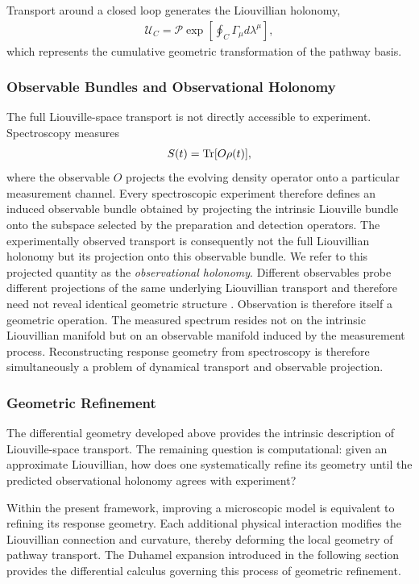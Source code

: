 Transport around a closed loop generates the Liouvillian
holonomy,
\begin{align}
\mathcal U_C
=
\mathcal P
\exp
\left[
\oint_C
\Gamma_\mu
d\lambda^\mu
\right],
\end{align}
which represents the cumulative geometric transformation of the
pathway basis.

\subsubsection{Observable Bundles and Observational Holonomy}
The full Liouville-space transport is not directly accessible to
experiment. Spectroscopy measures
\begin{align}
S(t)
=
{\rm Tr}
[
O\rho(t)
],
\end{align}
where the observable $O$ projects the evolving density operator
onto a particular measurement channel. Every spectroscopic
experiment therefore defines an induced observable bundle obtained
by projecting the intrinsic Liouville bundle onto the subspace
selected by the preparation and detection operators.
The experimentally observed transport is consequently not the
full Liouvillian holonomy but its projection onto this observable
bundle. We refer to this projected quantity as the
\emph{observational holonomy}. Different observables probe
different projections of the same underlying Liouvillian
transport and therefore need not reveal identical geometric
structure
.
Observation is therefore itself a geometric operation. The
measured spectrum resides not on the intrinsic Liouvillian
manifold but on an observable manifold induced by the
measurement process. Reconstructing response geometry from
spectroscopy is therefore simultaneously a problem of dynamical
transport and observable projection.

\subsubsection{Geometric Refinement}
The differential geometry developed above provides the intrinsic
description of Liouville-space transport. The remaining question
is computational: given an approximate Liouvillian, how does one
systematically refine its geometry until the predicted
observational holonomy agrees with experiment?

Within the present framework, improving a microscopic model is
equivalent to refining its response geometry. Each additional
physical interaction modifies the Liouvillian connection and
curvature, thereby deforming the local geometry of pathway
transport. The Duhamel expansion introduced in the following
section provides the differential calculus governing this process
of geometric refinement.


